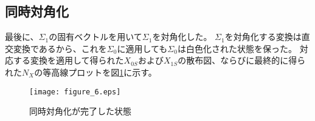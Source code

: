 \documentclass[uplatex,a4paper]{jsarticle}
\begin{document}
\subsection{同時対角化}
最後に、$\Sigma_1$の固有ベクトルを用いて$\Sigma_1$を対角化した。
$\Sigma_1$を対角化する変換は直交変換であるから、これを$\Sigma_0$に適用しても$\Sigma_0$は白色化された状態を保った。
対応する変換を適用して得られた$X_{0S}$および$X_{1S}$の散布図、ならびに最終的に得られた$N_X$の等高線プロットを図\ref{fig:scatter2}に示す。
\begin{figure}[htbp]
\begin{center}
\texttt{[image: figure\_6.eps]}
\caption{同時対角化が完了した状態}
\label{fig:scatter2}
\end{center}
\end{figure}
\end{document}
